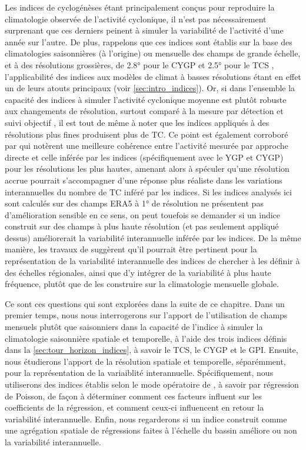 \documentclass[../main.tex]{subfiles}
\begin{document}
Les indices de cyclogénèses étant principalement conçus pour reproduire la climatologie observée de l'activité cyclonique, il n'est pas nécessairement
surprenant que ces derniers peinent à simuler la variabilité de l'activité d'une année sur l'autre. De plus, rappelons que ces indices sont établis sur la base
des climatologies saisonnières (à l'origine) ou mensuelle des champs de grande échelle, et à des résolutions grossières, de \ang{2.8} pour le CYGP
\parencite{royer_gcm_1998} et \ang{2.5} pour le TCS \parencite{tippett_poisson_2011}, l'applicabilité des indices aux modèles de climat à basses résolutions
étant en effet un de leurs atouts principaux (voir \cref{sec:intro_indices}). Or, si dans l'ensemble la capacité des indices à simuler l'activité cyclonique
moyenne est plutôt robuste aux changements de résolution, surtout comparé à la mesure par détection et suivi objectif \parencite[][voir aussi
\cref{fig:GP_resolution}]{camargo_tropical_2007}, il est tout de même à noter que les indices appliqués à des résolutions plus fines produisent plus de TC. Ce
point est également corroboré par \textcite{mcdonald_tropical_2005} qui notèrent une meilleure cohérence entre l'activité mesurée par approche directe et celle
inférée par les indices (spécifiquement avec le YGP et CYGP) pour les résolutions les plus hautes, amenant alors \textcite{camargo_tropical_2007} à spéculer
qu'une résolution accrue pourrait s'accompagner d'une réponse plus réaliste dans les variations interannuelles du nombre de TC inféré par les indices. Si les
indices analysés ici sont calculés sur des champs ERA5 à \ang{1} de résolution ne présentent pas d'amélioration sensible en ce sens, on peut touefois se
demander si un indice construit sur des champs à plus haute résolution (et pas seulement appliqué dessus) améliorerait la variabilité interannuelle inférée par
les indices. De la même manière, les travaux de \textcite{bruyere_investigating_2012,waters_largescale_2012} suggèrent qu'il pourrait être pertinent pour la
représentation de la variabilité interannuelle des indices de chercher à les définir à des échelles régionales, ainsi que d'y intégrer de la variabilité à plus
haute fréquence, plutôt que de les construire sur la climatologie mensuelle globale.

Ce sont ces questions qui sont explorées dans la suite de ce chapitre. Dans un premier temps, nous nous interrogerons sur l'apport de l'utilisation de champs
mensuels plutôt que saisonniers dans la capacité de l'indice à simuler la climatologie saisonnière spatiale et temporelle, à l'aide des trois indices définis
dans la \cref{sec:tour_horizon_indices}, à savoir le TCS, le CYGP et le GPI. Ensuite, nous étudierons l'apport de la résolution spatiale et temporelle,
séparémment, pour la représentation de la variaiblité interannuelle. Spécifiquement, nous utiliserons des indices établis selon le mode opératoire de
\textcite{tippett_poisson_2011}, à savoir par régression de Poisson, de façon à déterminer comment ces facteurs influent sur les coefficients de la régression,
et comment ceux-ci influencent en retour la variabilité interannuelle. Enfin, nous regarderons si un indice construit comme une agrégation spatiale de
régressions faites à l'échelle du bassin améliore ou non la variabilité interannuelle.
\end{document}
